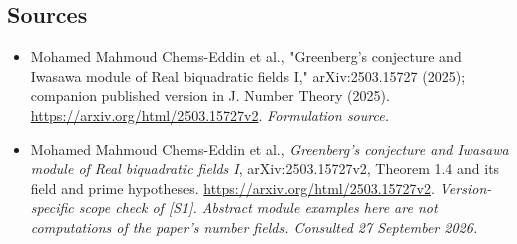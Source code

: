 \documentclass[11pt]{article}
\begin{document}
\subsection{Sources}
\begin{itemize}
\item[S1]Mohamed Mahmoud Chems-Eddin et al., "Greenberg's conjecture and Iwasawa module of Real biquadratic fields I," arXiv:2503.15727 (2025); companion published version in J. Number Theory (2025).
\url{https://arxiv.org/html/2503.15727v2}.
\textit{Formulation source.}
\item[E1]Mohamed Mahmoud Chems-Eddin et al., \emph{Greenberg's conjecture
and Iwasawa module of Real biquadratic fields I}, arXiv:2503.15727v2,
Theorem 1.4 and its field and prime hypotheses.
\url{https://arxiv.org/html/2503.15727v2}.
\textit{Version-specific scope check of [S1]. Abstract module examples
here are not computations of the paper's number fields.
Consulted 27 September 2026.}

\end{itemize}
\end{document}
